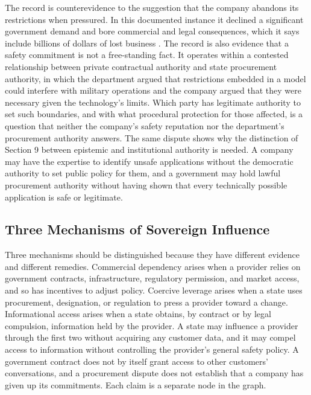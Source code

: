 \documentclass[12pt]{article}
\theoremstyle{definition}
\theoremstyle{remark}
\begin{document}
The record is counterevidence to the suggestion that the company abandons its restrictions when pressured. In this documented instance it declined a significant government demand and bore commercial and legal consequences, which it says include billions of dollars of lost business \cite{dailyrecord2026}. The record is also evidence that a safety commitment is not a free-standing fact. It operates within a contested relationship between private contractual authority and state procurement authority, in which the department argued that restrictions embedded in a model could interfere with military operations and the company argued that they were necessary given the technology's limits. Which party has legitimate authority to set such boundaries, and with what procedural protection for those affected, is a question that neither the company's safety reputation nor the department's procurement authority answers. The same dispute shows why the distinction of Section 9 between epistemic and institutional authority is needed. A company may have the expertise to identify unsafe applications without the democratic authority to set public policy for them, and a government may hold lawful procurement authority without having shown that every technically possible application is safe or legitimate.

\subsection{Three Mechanisms of Sovereign Influence}

Three mechanisms should be distinguished because they have different evidence and different remedies. Commercial dependency arises when a provider relies on government contracts, infrastructure, regulatory permission, and market access, and so has incentives to adjust policy. Coercive leverage arises when a state uses procurement, designation, or regulation to press a provider toward a change. Informational access arises when a state obtains, by contract or by legal compulsion, information held by the provider. A state may influence a provider through the first two without acquiring any customer data, and it may compel access to information without controlling the provider's general safety policy. A government contract does not by itself grant access to other customers' conversations, and a procurement dispute does not establish that a company has given up its commitments. Each claim is a separate node in the graph.
\end{document}
